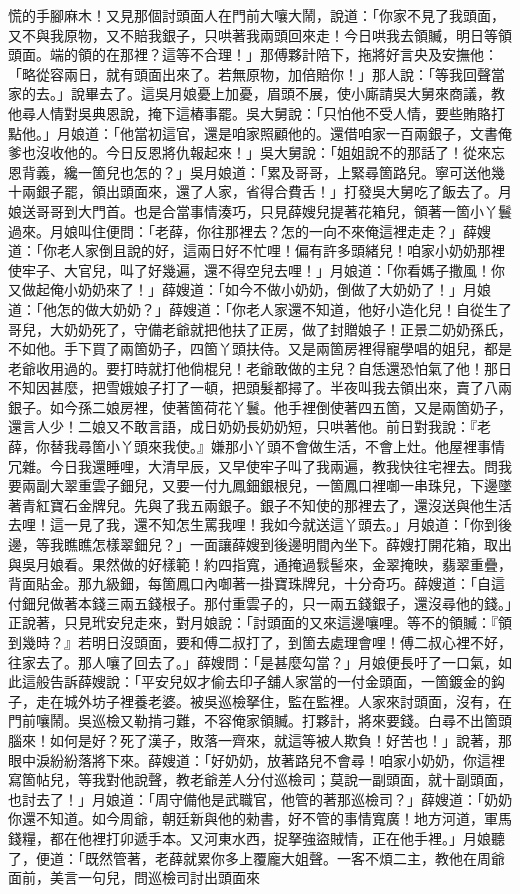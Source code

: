 慌的手腳麻木！又見那個討頭面人在門前大嚷大鬧，說道：「你家不見了我頭面，又不與我原物，又不賠我銀子，只哄著我兩頭回來走！今日哄我去領贓，明日等領頭面。端的領的在那裡？這等不合理！」那傅夥計陪下，拖將好言央及安撫他：「略從容兩日，就有頭面出來了。若無原物，加倍賠你！」那人說：「等我回聲當家的去。」說畢去了。這吳月娘憂上加憂，眉頭不展，使小廝請吳大舅來商議，教他尋人情對吳典恩說，掩下這樁事罷。吳大舅說：「只怕他不受人情，要些賄賂打點他。」月娘道：「他當初這官，還是咱家照顧他的。還借咱家一百兩銀子，文書俺爹也沒收他的。今日反恩將仇報起來！」吳大舅說：「姐姐說不的那話了！從來忘恩背義，纔一箇兒也怎的？」吳月娘道：「累及哥哥，上緊尋箇路兒。寧可送他幾十兩銀子罷，領出頭面來，還了人家，省得合費舌！」打發吳大舅吃了飯去了。月娘送哥哥到大門首。也是合當事情湊巧，只見薛嫂兒提著花箱兒，領著一箇小丫鬟過來。月娘叫住便問：「老薛，你往那裡去？怎的一向不來俺這裡走走？」薛嫂道：「你老人家倒且說的好，這兩日好不忙哩！偏有許多頭緒兒！咱家小奶奶那裡使牢子、大官兒，叫了好幾遍，還不得空兒去哩！」月娘道：「你看媽子撒風！你又做起俺小奶奶來了！」薛嫂道：「如今不做小奶奶，倒做了大奶奶了！」月娘道：「他怎的做大奶奶？」薛嫂道：「你老人家還不知道，他好小造化兒！自從生了哥兒，大奶奶死了，守備老爺就把他扶了正房，做了封贈娘子！正景二奶奶孫氏，不如他。手下買了兩箇奶子，四箇丫頭扶侍。又是兩箇房裡得寵學唱的姐兒，都是老爺收用過的。要打時就打他倘棍兒！老爺敢做的主兒？自恁還恐怕氣了他！那日不知因甚麼，把雪娥娘子打了一頓，把頭髮都撏了。半夜叫我去領出來，賣了八兩銀子。如今孫二娘房裡，使著箇荷花丫鬟。他手裡倒使著四五箇，又是兩箇奶子，還言人少！二娘又不敢言語，成日奶奶長奶奶短，只哄著他。前日對我說：『老薛，你替我尋箇小丫頭來我使。』嫌那小丫頭不會做生活，不會上灶。他屋裡事情冗雜。今日我還睡哩，大清早辰，又早使牢子叫了我兩遍，教我快往宅裡去。問我要兩副大翠重雲子鈿兒，又要一付九鳳鈿銀根兒，一箇鳳口裡啣一串珠兒，下邊墜著青紅寶石金牌兒。先與了我五兩銀子。銀子不知使的那裡去了，還沒送與他生活去哩！這一見了我，還不知怎生罵我哩！我如今就送這丫頭去。」月娘道：「你到後邊，等我瞧瞧怎樣翠鈿兒？」一面讓薛嫂到後邊明間內坐下。薛嫂打開花箱，取出與吳月娘看。果然做的好樣範！約四指寬，通掩過䯼髻來，金翠掩映，翡翠重疊，背面貼金。那九級鈿，每箇鳳口內啣著一掛寶珠牌兒，十分奇巧。薛嫂道：「自這付鈿兒做著本錢三兩五錢根子。那付重雲子的，只一兩五錢銀子，還沒尋他的錢。」正說著，只見玳安兒走來，對月娘說：「討頭面的又來這邊嚷哩。等不的領贓：『領到幾時？』若明日沒頭面，要和傅二叔打了，到箇去處理會哩！傅二叔心裡不好，往家去了。那人嚷了回去了。」薛嫂問：「是甚麼勾當？」月娘便長吁了一口氣，如此這般告訴薛嫂說：「平安兒奴才偷去印子舖人家當的一付金頭面，一箇鍍金的鈎子，走在城外坊子裡養老婆。被吳巡檢拏住，監在監裡。人家來討頭面，沒有，在門前嚷鬧。吳巡檢又勒掯刁難，不容俺家領贓。打夥計，將來要錢。白尋不出箇頭腦來！如何是好？死了漢子，敗落一齊來，就這等被人欺負！好苦也！」說著，那眼中淚紛紛落將下來。薛嫂道：「好奶奶，放著路兒不會尋！咱家小奶奶，你這裡寫箇帖兒，等我對他說聲，教老爺差人分付巡檢司；莫說一副頭面，就十副頭面，也討去了！」月娘道：「周守備他是武職官，他管的著那巡檢司？」薛嫂道：「奶奶你還不知道。如今周爺，朝廷新與他的勑書，好不管的事情寬廣！地方河道，軍馬錢糧，都在他裡打卯遞手本。又河東水西，捉拏強盜賊情，正在他手裡。」月娘聽了，便道：「既然管著，老薛就累你多上覆龐大姐聲。一客不煩二主，教他在周爺面前，美言一句兒，問巡檢司討出頭面來